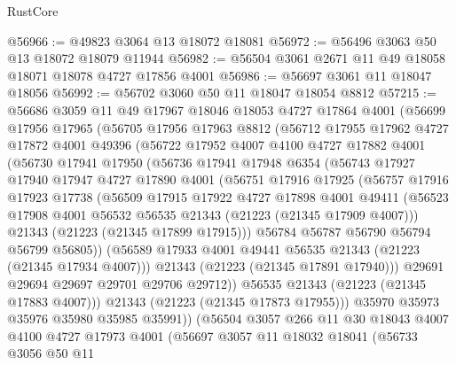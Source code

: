 \begin{lexlean}{RustCore}
\begin{coremodule}
@56966 := @49823 @3064 @13 @18072 @18081
@56972 := @56496 @3063 @50 @13 @18072 @18079 @11944
@56982 := @56504 @3061 @2671 @11 @49 @18058 @18071 @18078 @4727 @17856 @4001
@56986 := @56697 @3061 @11 @18047 @18056
@56992 := @56702 @3060 @50 @11 @18047 @18054 @8812
@57215 := @56686
    @3059
    @11
    @49
    @17967
    @18046
    @18053
    @4727
    @17864
    @4001
    (@56699
      @17956
      @17965
      (@56705
        @17956
        @17963
        @8812
        (@56712
          @17955
          @17962
          @4727
          @17872
          @4001
          @49396
          (@56722
            @17952
            @4007
            @4100
            @4727
            @17882
            @4001
            (@56730
              @17941
              @17950
              (@56736
                @17941
                @17948
                @6354
                (@56743
                  @17927
                  @17940
                  @17947
                  @4727
                  @17890
                  @4001
                  (@56751
                    @17916
                    @17925
                    (@56757
                      @17916
                      @17923
                      @17738
                      (@56509
                        @17915
                        @17922
                        @4727
                        @17898
                        @4001
                        @49411
                        (@56523 @17908 @4001 @56532 @56535 @21343 (@21223 (@21345 @17909 @4007)))
                        @21343
                        (@21223 (@21345 @17899 @17915)))
                      @56784
                      @56787
                      @56790
                      @56794
                      @56799
                      @56805))
                  (@56589 @17933 @4001 @49441 @56535 @21343 (@21223 (@21345 @17934 @4007)))
                  @21343
                  (@21223 (@21345 @17891 @17940)))
                @29691
                @29694
                @29697
                @29701
                @29706
                @29712))
            @56535
            @21343
            (@21223 (@21345 @17883 @4007)))
          @21343
          (@21223 (@21345 @17873 @17955)))
        @35970
        @35973
        @35976
        @35980
        @35985
        @35991))
    (@56504
      @3057
      @266
      @11
      @30
      @18043
      @4007
      @4100
      @4727
      @17973
      @4001
      (@56697
        @3057
        @11
        @18032
        @18041
        (@56733
          @3056
          @50
          @11

\end{coremodule}
\end{lexlean}
